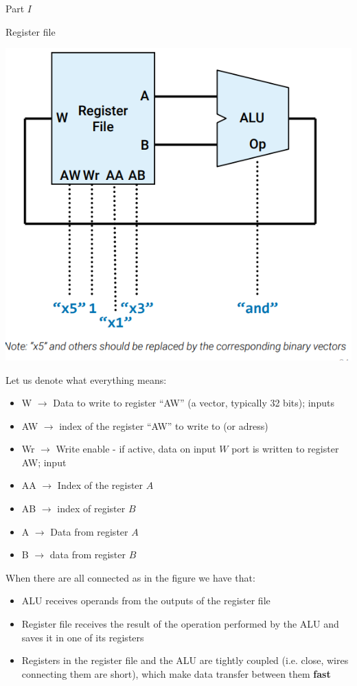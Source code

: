 \begin{parag}{Part $I$}
\begin{subparag}{Register file}
        \end{subparag}
       \begin{center}
           \includegraphics[scale=0.7]{162025-06-20.png}
       \end{center}
       Let us denote what everything means:
           \begin{itemize}
               \item W $\to$ Data to write to register ``AW'' (a vector, typically 32 bits); inputs
               \item AW $\to$ index of the register ``AW'' to write to (or adress)
               \item Wr $\to$ Write enable - if active, data on input $W$ port is written to register AW; input
               \item AA $\to$ Index of the register $A$
               \item AB $\to$ index of register $B$
               \item A $\to$ Data from register $A$
               \item B $\to$ data from register $B$
           \end{itemize}
           When there are all connected as in the figure we have that:
           \begin{itemize}
               \item ALU receives operands from the outputs of the register file
               \item Register file receives the result of the operation performed by the ALU and saves it in one of its registers
               \item Registers in the register file and the ALU are tightly coupled (i.e. close, wires connecting them are short), which  make data transfer between them \textbf{fast}
           \end{itemize}
           
           
       
        

        
\end{parag}


